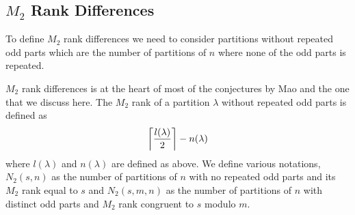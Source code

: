 \subsection{$M_2$ Rank Differences}
To define $M_2$ rank differences we need to consider partitions without repeated odd parts which are the number of partitions of $n$ where none of the odd parts is repeated.

$M_2$ rank differences is at the heart of most of the conjectures by Mao and the one that we discuss here. The $M_2$ rank of a partition $\lambda$ without repeated odd parts is defined as
$$\ceil*{\frac{l(\lambda)}{2}} - n(\lambda)$$
where $l(\lambda)$ and $n(\lambda)$ are defined as above.
We define various notations, $N_2(s,n)$ as the number of partitions of $n$ with no repeated odd parts and its $M_2$ rank equal to $s$ and $N_2(s,m,n)$ as the number of partitions of $n$ with distinct odd parts and $M_2$ rank congruent to $s$ modulo $m$.
